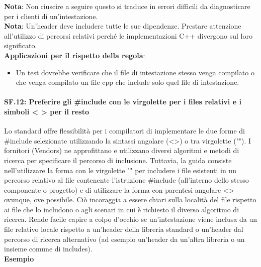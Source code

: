 \textsf{\small \textbf{Nota}: Non riuscire a seguire questo si traduce in errori difficili da diagnosticare per i clienti di un'intestazione.} \\

\textsf{\small \textbf{Nota}: Un'header deve includere tutte le sue dipendenze. Prestare attenzione all'utilizzo di percorsi relativi perché le implementazioni C++ divergono sul loro significato.} \\

\textsf{\small \textbf{Applicazioni per il rispetto della regola}: }

\begin{itemize}
	\item \textsf{\small Un test dovrebbe verificare che il file di intestazione stesso venga compilato o che venga compilato un file cpp che include solo quel file di intestazione.}
\end{itemize}

\paragraph{SF.12: Preferire gli \#include con le virgolette per i files relativi e i simboli < > per il resto} %

\textsf{\small Lo standard offre flessibilità per i compilatori di implementare le due forme di \#include selezionate utilizzando la sintassi angolare (<>) o tra virgolette (""). I fornitori (Vendors) ne approfittano e utilizzano diversi algoritmi e metodi di ricerca per specificare il percorso di inclusione. Tuttavia, la guida consiste nell'utilizzare la forma con le virgolette "" per includere i file esistenti in un percorso relativo al file contenente l'istruzione \#include (all'interno dello stesso componente o progetto) e di utilizzare la forma con parentesi angolare <> ovunque, ove possibile. Ciò incoraggia a essere chiari sulla località del file rispetto ai file che lo includono o agli scenari in cui è richiesto il diverso algoritmo di ricerca. Rende facile capire a colpo d'occhio se un'intestazione viene inclusa da un file relativo locale rispetto a un'header della libreria standard o un'header dal percorso di ricerca alternativo (ad esempio un'header da un'altra libreria o un insieme comune di includes).} \\

\textsf{\small \textbf{Esempio}}

